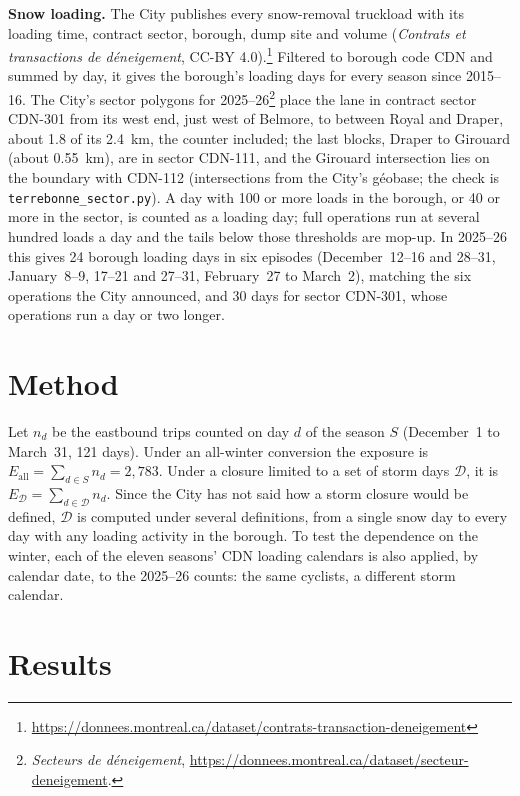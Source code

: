 \documentclass[11pt,letterpaper]{article}
\begin{document}
\textbf{Snow loading.} The City publishes every snow-removal truckload with
its loading time, contract sector, borough, dump site and volume
(\emph{Contrats et transactions de d\'eneigement}, CC-BY
4.0).\footnote{\url{https://donnees.montreal.ca/dataset/contrats-transaction-deneigement}}
Filtered to borough code CDN and summed by day, it gives the borough's
loading days for every season since 2015--16. The City's sector polygons
for 2025--26\footnote{\emph{Secteurs de d\'eneigement},
\url{https://donnees.montreal.ca/dataset/secteur-deneigement}.} place the
lane in contract sector CDN-301 from its west end, just west of Belmore,
to between Royal and Draper, about 1.8 of its 2.4~km, the counter
included; the last blocks, Draper to Girouard (about 0.55~km), are in
sector CDN-111, and the Girouard intersection lies on the boundary with
CDN-112 (intersections from the City's g\'eobase; the check is
\texttt{terrebonne\_sector.py}). A
day with 100 or more loads in the borough, or 40 or more in the sector, is
counted as a loading day; full operations run at several hundred loads a
day and the tails below those thresholds are mop-up. In 2025--26 this gives
24 borough loading days in six episodes (December~12--16 and 28--31,
January~8--9, 17--21 and 27--31, February~27 to March~2), matching the six
operations the City announced, and 30 days for sector CDN-301, whose
operations run a day or two longer.

\section{Method}

Let $n_d$ be the eastbound trips counted on day $d$ of the season $S$
(December~1 to March~31, 121 days). Under an all-winter conversion the
exposure is $E_{\text{all}} = \sum_{d\in S} n_d = 2{,}783$. Under a closure
limited to a set of storm days $\mathcal{D}$, it is $E_{\mathcal{D}} =
\sum_{d\in\mathcal{D}} n_d$. Since the City has not said how a storm
closure would be defined, $\mathcal{D}$ is computed under several
definitions, from a single snow day to every day with any loading activity
in the borough. To test the dependence on the winter, each of the eleven
seasons' CDN loading calendars is also applied, by calendar date, to the
2025--26 counts: the same cyclists, a different storm calendar.

\section{Results}
\end{document}
